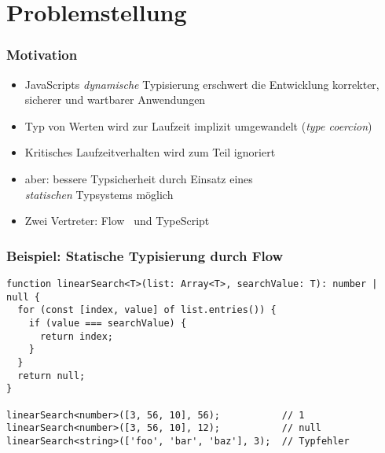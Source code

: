 


  \frame[plain]{\titlepage}


  \section{Problemstellung}
    \begin{frame}
      \frametitle{Motivation}
      \begin{itemize}
        \item JavaScripts \emph{dynamische} Typisierung erschwert die Entwicklung korrekter, sicherer und wartbarer Anwendungen~\autocite{NIKHIL:2014,PRADEL:2015,BIERMAN:2014}
        \item Typ von Werten wird zur Laufzeit implizit umgewandelt (\textit{type coercion})
        \item Kritisches Laufzeitverhalten wird zum Teil ignoriert
        \item aber: bessere Typsicherheit durch Einsatz eines\\\emph{statischen} Typsystems möglich
        \item Zwei Vertreter: Flow~\autocite{FLOW:PAPER} und TypeScript~\autocite{TYPESCRIPT:SPEC}
      \end{itemize}
    \end{frame}

    \begin{frame}[fragile]
      \frametitle{Beispiel: Statische Typisierung durch Flow}
      \begin{lstlisting}
function linearSearch<T>(list: Array<T>, searchValue: T): number | null {
  for (const [index, value] of list.entries()) {
    if (value === searchValue) {
      return index;
    }
  }
  return null;
}

linearSearch<number>([3, 56, 10], 56);           // 1
linearSearch<number>([3, 56, 10], 12);           // null
linearSearch<string>(['foo', 'bar', 'baz'], 3);  // Typfehler
      \end{lstlisting}
    \end{frame}

